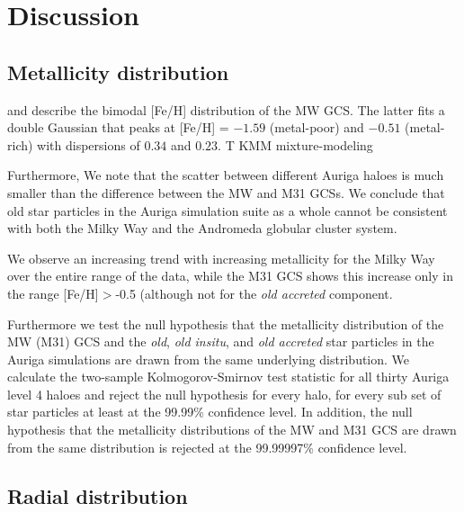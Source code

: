 \documentclass[a4paper,fleqn,usenatbib]{mnras}
\begin{document}
\section{Discussion}
\label{sec:discussion}
\subsection{Metallicity distribution}
\label{sec:discussion_FeH}
\citet[][p. 234]{1998gcs..book.....A} and \citet[][p. 38]{Harris2001} describe
the bimodal [Fe/H] distribution of the MW GCS. The latter fits a double
Gaussian that peaks at [Fe/H] = $-1.59$ (metal-poor) and $-0.51$ (metal-rich)
with dispersions of $0.34$ and $0.23$. T
KMM mixture-modeling

Furthermore, 
We note that the scatter between different
Auriga haloes is much smaller than the difference between the MW and M31 GCSs.
We conclude that old star particles in the Auriga simulation suite as a whole
cannot be consistent with both the Milky Way and the Andromeda globular cluster
system.

We observe an increasing trend with increasing metallicity
for the Milky Way over the entire range of the data, while the M31 GCS shows
this increase only in the range [Fe/H]$>$-0.5 (although not for the \emph{old
accreted} component.


Furthermore we test the null hypothesis that the metallicity distribution of the
MW (M31) GCS and the \emph{old}, \emph{old insitu}, and \emph{old accreted} star
particles in the Auriga simulations are drawn from the same underlying
distribution. We calculate the two-sample Kolmogorov-Smirnov test statistic for
all thirty Auriga level 4 haloes and reject the null hypothesis for every halo,
for every sub set of star particles at least at the 99.99\% confidence level.
In addition, the null hypothesis that the metallicity distributions of the MW
and M31 GCS are drawn from the same distribution is rejected at the 99.99997\%
confidence level.


\subsection{Radial distribution}
\label{sec:discussion_Rgc}

\end{document}
